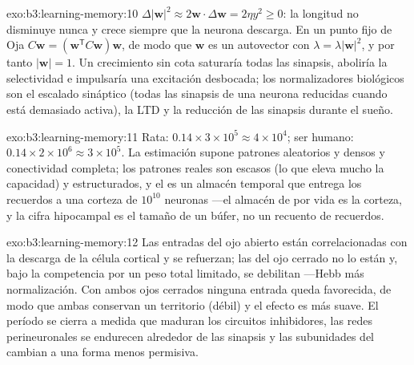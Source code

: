 \begin{solution}{exo:b3:learning-memory:10}
$\Delta|\mathbf{w}|^{2} \approx 2\mathbf{w}\cdot\Delta\mathbf{w} = 2\eta
y^{2} \ge 0$: la longitud no disminuye nunca y crece siempre que la
neurona descarga. En un punto fijo de Oja $C\mathbf{w} = (\mathbf{w}^{\mathsf{T}}C
\mathbf{w})\mathbf{w}$, de modo que $\mathbf{w}$ es un autovector con $\lambda =
\lambda|\mathbf{w}|^{2}$, y por tanto $|\mathbf{w}| = 1$. Un crecimiento
sin cota saturaría todas las sinapsis, aboliría la selectividad e
impulsaría una excitación desbocada; los normalizadores biológicos son
el escalado sináptico (todas las sinapsis de una neurona reducidas
cuando está demasiado activa), la LTD y la reducción de las sinapsis
durante el sueño.
\end{solution}

\begin{solution}{exo:b3:learning-memory:11}
Rata: $0.14\times 3\times 10^{5} \approx 4\times 10^{4}$; ser humano: $0.14
\times 2\times 10^{6} \approx 3\times 10^{5}$. La estimación supone
patrones aleatorios y densos y conectividad completa; los patrones
reales son escasos (lo que eleva mucho la capacidad) y estructurados, y
el  es un almacén temporal que entrega los recuerdos a una
corteza de $10^{10}$ neuronas ---el almacén de por vida es la corteza,
y la cifra hipocampal es el tamaño de un búfer, no un recuento de
recuerdos.
\end{solution}

\begin{solution}{exo:b3:learning-memory:12}
Las entradas del ojo abierto están correlacionadas con la descarga de
la célula cortical y se refuerzan; las del ojo cerrado no lo están y,
bajo la competencia por un peso total limitado, se debilitan ---Hebb
más normalización. Con ambos ojos cerrados ninguna entrada queda
favorecida, de modo que ambas conservan un territorio (débil) y el
efecto es más suave. El período se cierra a medida que maduran los
circuitos inhibidores, las redes perineuronales se endurecen alrededor
de las sinapsis y las subunidades del  cambian a una forma
menos permisiva.
\end{solution}

